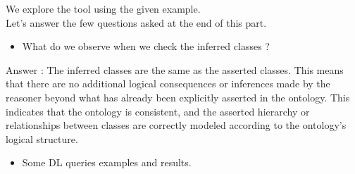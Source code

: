 


We explore the tool using the given example. \\
Let's answer the few questions asked at the end of this part.
\smallskip
\begin{itemize}
    \item What do we observe when we check the inferred classes ?
\end{itemize}
\smallskip
Answer :    The inferred classes are the same as the asserted classes. This means that there are no additional logical consequences or inferences made by the reasoner beyond what has already been explicitly asserted in the ontology. This indicates that the ontology is consistent, and the asserted hierarchy or relationships between classes are correctly modeled according to the ontology's logical structure.

\begin{itemize}
    \item Some DL queries examples and results.
\end{itemize}

